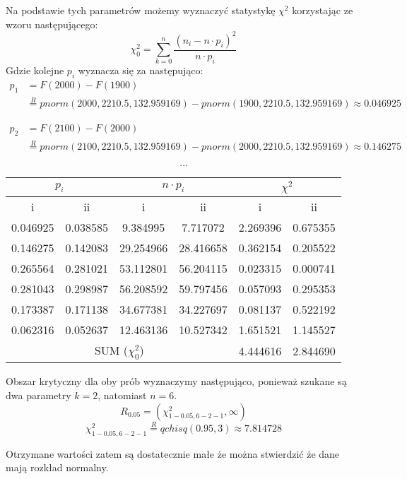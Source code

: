 \documentclass{article}
\begin{document}
Na podstawie tych parametrów możemy wyznaczyć statystykę $\chi^2$ korzystając ze wzoru następującego:
\[ \chi^2_0 = \sum_{k=0}^n \frac{(n_i - n \cdot p_i)^2}{n \cdot p_i} \]
Gdzie kolejne $p_i$ wyznacza się za następująco:
\begin{align*}
p_1 & = F(2000) - F(1900) \\
& \overset{R}{=} pnorm(2000, 2210.5, 132.959169) - pnorm(1900, 2210.5, 132.959169) \approx 0.046925 \end{align*}

\begin{align*} p_2 & = F(2100) - F(2000) \\
& \overset{R}{=} pnorm(2100, 2210.5, 132.959169) - pnorm(2000, 2210.5, 132.959169) \approx 0.146275 \end{align*}

\[ \dots \]

\begin{center} \begin{tabular}{|c|c|c|c|c|c|} \hline
\multicolumn{2}{|c|}{$p_i$} & \multicolumn{2}{|c|}{$n \cdot p_i$} & \multicolumn{2}{|c|}{$\chi^2$} \\ \hline
i & ii & i & ii & i & ii \\ \hline
0.046925 & 0.038585 & 9.384995 & 7.717072 & 2.269396 & 0.675355 \\ \hline
0.146275 & 0.142083 & 29.254966 & 28.416658 & 0.362154 & 0.205522 \\ \hline
0.265564 & 0.281021 & 53.112801 & 56.204115 & 0.023315 & 0.000741 \\ \hline
0.281043 & 0.298987 & 56.208592 & 59.797456 & 0.057093 & 0.295353 \\ \hline
0.173387 & 0.171138 & 34.677381 & 34.227697 & 0.081137 & 0.522192 \\ \hline
0.062316 & 0.052637 & 12.463136 & 10.527342 & 1.651521 & 1.145527 \\ \hline
\multicolumn{4}{|c|}{SUM ($\chi^2_0$)} & 4.444616 & 2.844690 \\ \hline
\end{tabular} \end{center}

Obszar krytyczny dla oby prób wyznaczymy następująco, ponieważ szukane są dwa parametry $k = 2$, natomiast $n =6$.
\[ R_{0.05} = (\chi^2_{1-0.05,6-2-1}, \infty) \]
\[ \chi^2_{1-0.05,6-2-1} \overset{R}{=} qchisq(0.95, 3) \approx 7.814728 \]

Otrzymane wartości zatem są dostatecznie małe że można stwierdzić że dane mają rozkład normalny.
\end{document}
